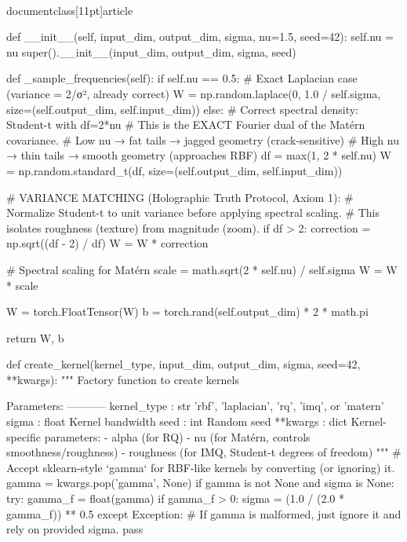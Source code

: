 \\documentclass[11pt]{article}
\begin{document}
\begin{CodeBlock}
    def __init__(self, input_dim, output_dim, sigma, nu=1.5, seed=42):
        self.nu = nu
        super().__init__(input_dim, output_dim, sigma, seed)

    def _sample_frequencies(self):
        if self.nu == 0.5:
            # Exact Laplacian case (variance = 2/σ², already correct)
            W = np.random.laplace(0, 1.0 / self.sigma,
                                  size=(self.output_dim, self.input_dim))
        else:
            # Correct spectral density: Student-t with df=2*nu
            # This is the EXACT Fourier dual of the Matérn covariance.
            # Low nu → fat tails → jagged geometry (crack-sensitive)
            # High nu → thin tails → smooth geometry (approaches RBF)
            df = max(1, 2 * self.nu)
            W = np.random.standard_t(df, size=(self.output_dim, self.input_dim))

            # VARIANCE MATCHING (Holographic Truth Protocol, Axiom 1):
            # Normalize Student-t to unit variance before applying spectral scaling.
            # This isolates roughness (texture) from magnitude (zoom).
            if df > 2:
                correction = np.sqrt((df - 2) / df)
                W = W * correction

            # Spectral scaling for Matérn
            scale = math.sqrt(2 * self.nu) / self.sigma
            W = W * scale

        W = torch.FloatTensor(W)
        b = torch.rand(self.output_dim) * 2 * math.pi

        return W, b


def create_kernel(kernel_type, input_dim, output_dim, sigma, seed=42, **kwargs):
    """
    Factory function to create kernels
    
    Parameters:
    -----------
    kernel_type : str
        'rbf', 'laplacian', 'rq', 'imq', or 'matern'
    sigma : float
        Kernel bandwidth
    seed : int
        Random seed
    **kwargs : dict
        Kernel-specific parameters:
          - alpha (for RQ)
          - nu (for Matérn, controls smoothness/roughness)
          - roughness (for IMQ, Student-t degrees of freedom)
    """
    # Accept sklearn-style `gamma` for RBF-like kernels by converting (or ignoring) it.
    gamma = kwargs.pop('gamma', None)
    if gamma is not None and sigma is None:
        try:
            gamma_f = float(gamma)
            if gamma_f > 0:
                sigma = (1.0 / (2.0 * gamma_f)) ** 0.5
        except Exception:
            # If gamma is malformed, just ignore it and rely on provided sigma.
            pass


\end{CodeBlock}
\end{document}
